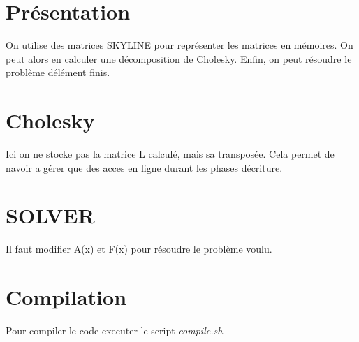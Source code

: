 \hypertarget{index_Présentation}{}\section{Présentation}\label{index_Présentation}
On utilise des matrices S\+K\+Y\+L\+I\+NE pour représenter les matrices en mémoires. On peut alors en calculer une décomposition de Cholesky. Enfin, on peut résoudre le problème d\textquotesingle{}élément finis. \hypertarget{index_Cholesky}{}\section{Cholesky}\label{index_Cholesky}
Ici on ne stocke pas la matrice L calculé, mais sa transposée. Cela permet de n\textquotesingle{}avoir a gérer que des acces en ligne durant les phases d\textquotesingle{}écriture. \hypertarget{index_SOLVER}{}\section{S\+O\+L\+V\+ER}\label{index_SOLVER}
Il faut modifier A(x) et F(x) pour résoudre le problème voulu. \hypertarget{index_Compilation}{}\section{Compilation}\label{index_Compilation}
Pour compiler le code executer le script {\itshape compile.\+sh}. 